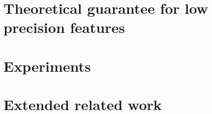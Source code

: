 \documentclass{article}
\begin{document}
%

\section{Theoretical guarantee for low precision features}
\label{sec:lprff_theory_appendix}


\section{Experiments}
\label{sec:exp_details}


%

\section{Extended related work}
\label{sec:app_extended_related}



%

%
\end{document}
